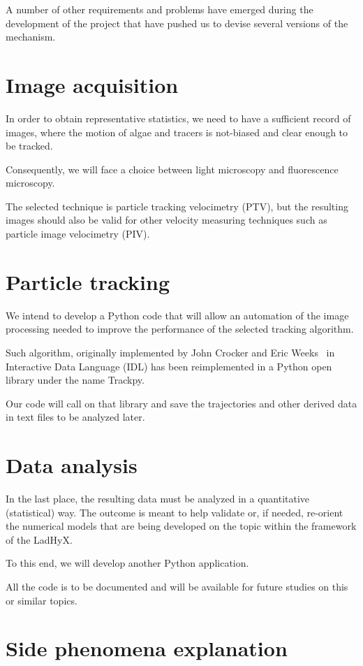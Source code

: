 A number of other requirements and problems have emerged during the development of the project that have pushed us to devise several versions of the mechanism.

\section{Image acquisition}

In order to obtain representative statistics, we need to have a sufficient record of images, where the motion of algae and tracers is not-biased and clear enough to be tracked.

Consequently, we will face a choice between light microscopy and fluorescence microscopy.

The selected technique is particle tracking velocimetry (PTV), but the resulting images should also be valid for other velocity measuring techniques such as particle image velocimetry (PIV).

\section{Particle tracking}

We intend to develop a Python code that will allow an automation of the image processing needed to improve the performance of the selected tracking algorithm.

Such algorithm, originally implemented by John Crocker and Eric Weeks~\cite{Crocker} in Interactive Data Language (IDL) has been reimplemented in a Python open library under the name Trackpy.

Our code will call on that library and save the trajectories and other derived data in text files to be analyzed later. 

\section{Data analysis}

In the last place, the resulting data must be analyzed in a quantitative (statistical) way. The outcome is meant to help validate or, if needed, re-orient the numerical models that are being developed on the topic within the framework of the LadHyX.

To this end, we will develop another Python application.

All the code is to be documented and will be available for future studies on this or similar topics.

\section{Side phenomena explanation}

